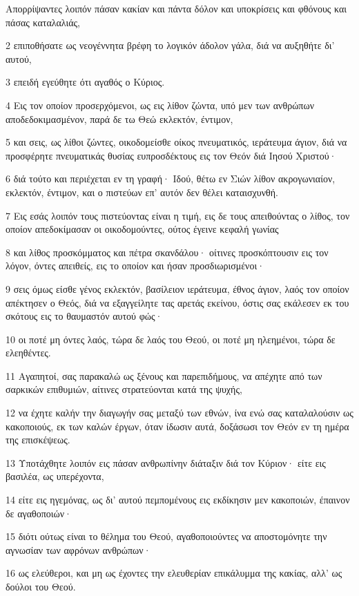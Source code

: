 \par Απορρίψαντες λοιπόν πάσαν κακίαν και πάντα δόλον και υποκρίσεις και φθόνους και πάσας καταλαλιάς,
\par 2 επιποθήσατε ως νεογέννητα βρέφη το λογικόν άδολον γάλα, διά να αυξηθήτε δι' αυτού,
\par 3 επειδή εγεύθητε ότι αγαθός ο Κύριος.
\par 4 Εις τον οποίον προσερχόμενοι, ως εις λίθον ζώντα, υπό μεν των ανθρώπων αποδεδοκιμασμένον, παρά δε τω Θεώ εκλεκτόν, έντιμον,
\par 5 και σεις, ως λίθοι ζώντες, οικοδομείσθε οίκος πνευματικός, ιεράτευμα άγιον, διά να προσφέρητε πνευματικάς θυσίας ευπροσδέκτους εις τον Θεόν διά Ιησού Χριστού·
\par 6 διά τούτο και περιέχεται εν τη γραφή· Ιδού, θέτω εν Σιών λίθον ακρογωνιαίον, εκλεκτόν, έντιμον, και ο πιστεύων επ' αυτόν δεν θέλει καταισχυνθή.
\par 7 Εις εσάς λοιπόν τους πιστεύοντας είναι η τιμή, εις δε τους απειθούντας ο λίθος, τον οποίον απεδοκίμασαν οι οικοδομούντες, ούτος έγεινε κεφαλή γωνίας
\par 8 και λίθος προσκόμματος και πέτρα σκανδάλου· οίτινες προσκόπτουσιν εις τον λόγον, όντες απειθείς, εις το οποίον και ήσαν προσδιωρισμένοι·
\par 9 σεις όμως είσθε γένος εκλεκτόν, βασίλειον ιεράτευμα, έθνος άγιον, λαός τον οποίον απέκτησεν ο Θεός, διά να εξαγγείλητε τας αρετάς εκείνου, όστις σας εκάλεσεν εκ του σκότους εις το θαυμαστόν αυτού φώς·
\par 10 οι ποτέ μη όντες λαός, τώρα δε λαός του Θεού, οι ποτέ μη ηλεημένοι, τώρα δε ελεηθέντες.
\par 11 Αγαπητοί, σας παρακαλώ ως ξένους και παρεπιδήμους, να απέχητε από των σαρκικών επιθυμιών, αίτινες στρατεύονται κατά της ψυχής,
\par 12 να έχητε καλήν την διαγωγήν σας μεταξύ των εθνών, ίνα ενώ σας καταλαλούσιν ως κακοποιούς, εκ των καλών έργων, όταν ίδωσιν αυτά, δοξάσωσι τον Θεόν εν τη ημέρα της επισκέψεως.
\par 13 Υποτάχθητε λοιπόν εις πάσαν ανθρωπίνην διάταξιν διά τον Κύριον· είτε εις βασιλέα, ως υπερέχοντα,
\par 14 είτε εις ηγεμόνας, ως δι' αυτού πεμπομένους εις εκδίκησιν μεν κακοποιών, έπαινον δε αγαθοποιών·
\par 15 διότι ούτως είναι το θέλημα του Θεού, αγαθοποιούντες να αποστομόνητε την αγνωσίαν των αφρόνων ανθρώπων·
\par 16 ως ελεύθεροι, και μη ως έχοντες την ελευθερίαν επικάλυμμα της κακίας, αλλ' ως δούλοι του Θεού.
